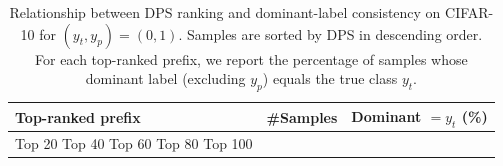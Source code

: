 \begin{table}[t]
\centering
\begin{tabular}{lrr}
\toprule
Top-ranked prefix & \#Samples & Dominant $= y_t$ (\%) \\
\midrule
Top 20%
Top 40%
Top 60%
Top 80%
Top 100%
\bottomrule
\caption{Relationship between DPS ranking and dominant-label consistency on CIFAR-10 for $(y_t, y_p) = (0, 1)$. Samples are sorted by DPS in descending order. For each top-ranked prefix, we report the percentage of samples whose dominant label (excluding $y_p$) equals the true class $y_t$.}
\label{tab:cifar10_dps_prefix}
\end{tabular}
\end{table}
